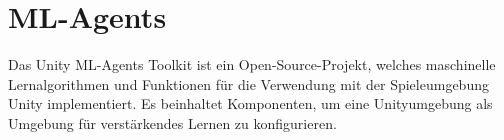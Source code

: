 \section{ML-Agents}
\label{sec:mlagents}
Das Unity ML-Agents Toolkit ist ein Open-Source-Projekt, welches maschinelle Lernalgorithmen und Funktionen für die Verwendung mit der Spieleumgebung Unity implementiert. Es beinhaltet Komponenten, um eine Unityumgebung als Umgebung für verstärkendes Lernen zu konfigurieren.\cite{juliani2020}



